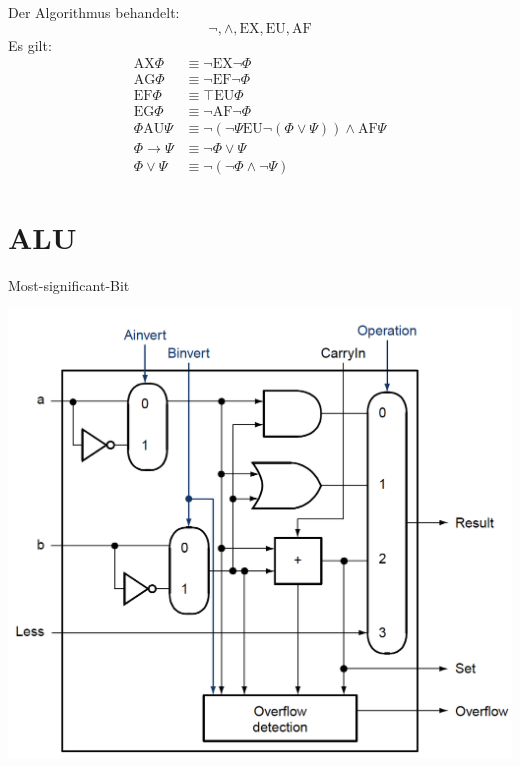 \documentclass[a4paper,6pt]{article}
\begin{document}
\begin{multicols*}{3}
Der Algorithmus behandelt:
\[ \neg, \wedge, \text{EX}, \text{EU}, \text{AF} \]
Es gilt:
\begin{align*}
\text{AX}\Phi &\equiv \neg \text{EX}\neg \Phi \\
\text{AG}\Phi &\equiv \neg \text{EF}\neg \Phi \\
\text{EF}\Phi &\equiv \top \text{EU}\Phi \\
\text{EG}\Phi &\equiv \neg \text{AF}\neg \Phi \\
\Phi \text{AU}\Psi &\equiv \neg(\neg \Psi \text{EU} \neg(\Phi \vee \Psi)) \wedge \text{AF}\Psi \\
\Phi \rightarrow \Psi &\equiv \neg \Phi \vee \Psi \\
\Phi \vee \Psi &\equiv \neg(\neg \Phi \wedge \neg \Psi)
\end{align*}


\section{ALU}

Most-significant-Bit
\begin{center}
    \includegraphics[width=1\linewidth]{resources/MostSignificantBit.png}
\end{center}


\end{multicols*}
\end{document}
